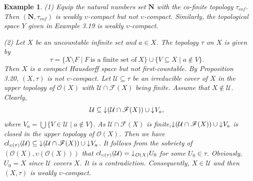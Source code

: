 \documentclass[preprint,12pt]{elsarticle}
\numberwithin{equation}{section}
\newtheorem{example}[theorem]{Example}
\newcommand{\dn}{\mathord{\downarrow}\hspace{0.05em}}
\begin{document}
\begin{example}{\rm (1) Equip the natural numbers set $\mathbf{N}$  with the co-finite topology $\tau_{cof}$. Then $(\mathbf{N},\tau_{cof})$ is weakly $\upsilon$-compact but not $\upsilon$-compact. Similarly, the topological space $Y$ given in Example 3.19 is weakly $\upsilon$-compact.

(2) Let $X$ be an uncountable infinite set and $a\in X$. The topology $\tau$ on $X$ is given by $$\tau=\{X\setminus F\mid F\ \mbox{is a finite set of}\ X\}\cup\{V\subseteq X\mid a\not\in V\}.$$ Then $X$ is a compact Hausdorff space but not first-countable. By Proposition 3.20, $(X,\tau)$ is not $\upsilon$-compact. Let $\mathcal{U}\subseteq\tau$ be an irreducible cover of $X$ in the upper topology of $\mathcal{O}(X)$ with $\mathcal{U}\cap \mathscr{F}(X)$ being finite. Assume that $X\not\in\mathcal{U}$. Clearly,
$$\mathcal{U}\subseteq \dn(\mathcal{U}\cap \mathscr{F}(X))\cup\dn V_{a},$$
where $V_{a}=\bigcup\{V\in\mathcal{U}\mid a\not\in V\}$. As $\mathcal{U}\cap \mathscr{F}(X)$ is finite,$\dn(\mathcal{U}\cap \mathscr{F}(X))\cup\dn V_{a}$ is closed in the upper topology of $\mathcal{O}(X)$. Then we have $cl_{\upsilon(\tau)}(\mathcal{U})\subseteq\dn(\mathcal{U}\cap \mathscr{F}(X))\cup\dn V_{a}$. It follows from the sobriety of $(\mathcal{O}(X),\upsilon(\mathcal{O}(X)))$ that $cl_{\upsilon(\tau)}(\mathcal{U})=\dn_{\mathcal{O}(X)}U_{0}$ for some $U_{0}\in\tau$. Obviously, $U_{0}=X$ since $\mathcal{U}$ covers $X$. It is a contradiction. Consequently, $X\in\mathcal{U}$ and then $(X,\tau)$ is weakly $\upsilon$-compact.

}
\end{example}
\end{document}

